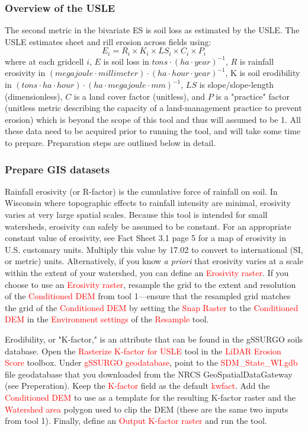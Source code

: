 \documentclass{article}
\newcommand{\toolPar}[1]{\textcolor{red}{#1}}
\begin{document}
		\subsubsection{Overview of the USLE}
			The second metric in the bivariate ES is soil loss as estimated by the USLE. The USLE estimates sheet and rill erosion across fields using:
			\begin{equation}
				E_{i} = R_{i} \times K_{i} \times LS_{i} \times C_{i} \times P_{i}
			\end{equation}
			where at each gridcell $i$, $E$ is soil loss in $tons \cdot (ha \cdot year)^{-1}$, $R$ is rainfall erosivity in $(megajoule \cdot millimeter) \cdot (ha \cdot hour \cdot year)^{-1}$, K is soil erodibility in $(tons \cdot ha \cdot hour) \cdot (ha \cdot megajoule \cdot mm)^{-1}$, $LS$ is slope/slope-length (dimensionless), $C$ is a land cover factor (unitless), and $P$ is a "practice" factor (unitless metric describing the capacity of a land-management practice to prevent erosion) which is beyond the scope of this tool and thus will assumed to be 1. All these data need to be acquired prior to running the tool, and will take some time to prepare. Preparation steps are outlined below in detail.
		\subsubsection{Prepare GIS datasets}
			Rainfall erosivity (or R-factor) is the cumulative force of rainfall on soil. In Wisconsin where topographic effects to rainfall intensity are minimal, erosivity varies at very large spatial scales. Because this tool is intended for small watersheds, erosivity can safely be assumed to be constant. For an appropriate constant value of erosivity, see \cite{u.s._e.p.a._stormwater_2005} Fact Sheet 3.1 page 5 for a map of erosivity in U.S. customary units. Multiply this value by 17.02 to convert to international (SI, or metric) units. Alternatively, if you know \emph{a priori} that erosivity varies at a scale within the extent of your watershed, you can define an \toolPar{Erosivity raster}. If you choose to use an \toolPar{Erosivity raster}, resample the grid to the extent and resolution of the \toolPar{Conditioned DEM} from tool 1---ensure that the resampled grid matches the grid of the \toolPar{Conditioned DEM} by setting the \toolPar{Snap Raster} to the \toolPar{Conditioned DEM} in the \toolPar{Environment settings} of the \toolPar{Resample} tool.
			
			Erodibility, or "K-factor," is an attribute that can be found in the gSSURGO soils database. Open the \toolPar{Rasterize K-factor for USLE} tool in the \toolPar{LiDAR Erosion Score} toolbox. Under \toolPar{gSSURGO geodatabase}, point to the \toolPar{SDM\_State\_WI.gdb} file geodatabase that you downloaded from the NRCS GeoSpatialDataGateway (see Preperation). Keep the \toolPar{K-factor} field as the default \toolPar{kwfact}. Add the \toolPar{Conditioned DEM} to use as a template for the resulting K-factor raster and the \toolPar{Watershed area} polygon used to clip the DEM (these are the same two inputs from tool 1). Finally, define an \toolPar{Output K-factor raster} and run the tool.
			
\end{document}
